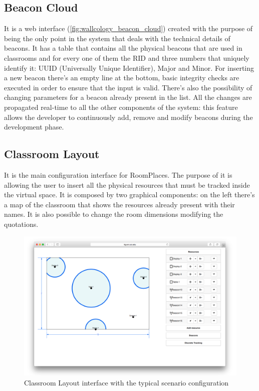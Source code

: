 \subsection{Beacon Cloud}
It is a web interface (\ref{fig:wallcology_beacon_cloud}) created with the purpose of being the only point in the system that deals with the technical details of beacons. It has a table that contains all the physical beacons that are used in classrooms and for every one of them the RID and three numbers that uniquely identify it: UUID (Universally Unique Identifier), Major and Minor. For inserting a new beacon there's an empty line at the bottom, basic integrity checks are executed in order to ensure that the input is valid. There's also the possibility of changing parameters for a beacon already present in the list. All the changes are propagated real-time to all the other components of the system: this feature allows the developer to continuously add, remove and modify beacons during the development phase.

\subsection{Classroom Layout}
It is the main configuration interface for RoomPlaces. The purpose of it is allowing the user to insert all the physical resources that must be tracked inside the virtual space. It is composed by two graphical components: on the left there's a map of the classroom that shows the resources already present with their names. It is also possible to change the room dimensions modifying the quotations.

\begin{figure}
\centering
\includegraphics[width=6in]{images/classroom-layout-map.png}
\caption{Classroom Layout interface with the typical scenario configuration}
\label{fig:classroom_layout_map}
\end{figure}

